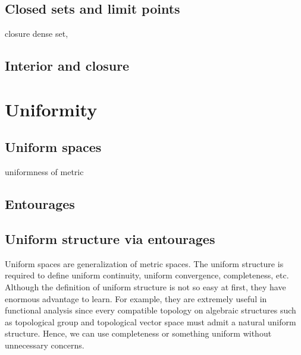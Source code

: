 \documentclass{../crs}
\begin{document}
\subsection{Closed sets and limit points}
 closure
 dense set,
\subsection{Interior and closure}




























\section{Uniformity}

\subsection{Uniform spaces}
uniformness of metric


\subsection{Entourages}

\subsection{Uniform structure via entourages}

Uniform spaces are generalization of metric spaces.
The uniform structure is required to define uniform continuity, uniform convergence, completeness, etc.
Although the definition of uniform structure is not so easy at first, they have enormous advantage to learn.
For example, they are extremely useful in functional analysis since every compatible topology on algebraic structures such as topological group and topological vector space must admit a natural uniform structure.
Hence, we can use completeness or something uniform without unnecessary concerns.
\end{document}
